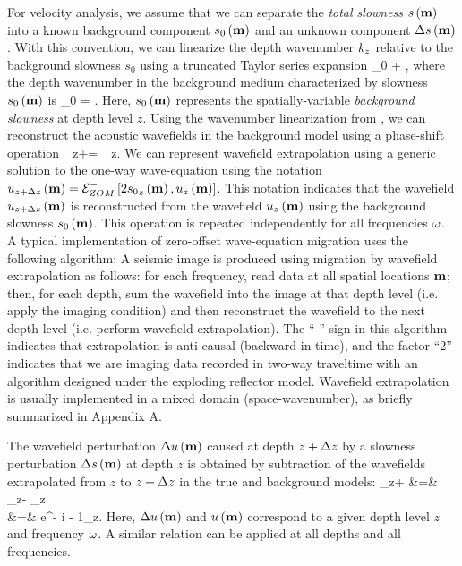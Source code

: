 For velocity analysis, we assume that we can separate the {\it total
slowness} $s\left ( {\bf m} \right)$ into a known background component $s_0\left ( {\bf m} \right)$ and an
unknown component $\Delta s\left ( {\bf m} \right)$. With this convention, we can linearize
the depth wavenumber ${k_z}$ relative to the background slowness $s_0$
using a truncated Taylor series expansion
%
\beq \label{eqn:SSR-taylor}
\kz \approx \kz_0 + \dkzds \ds\ofm \;,
\eeq
%
where the depth wavenumber in the background medium characterized by
slowness $s_0\left ( {\bf m} \right)$ is
%
\beq
\kz_0 = \SSR{2\ws_0\ofm}{\km} \;.
\eeq
%
Here, $s_0\left ( {\bf m} \right)$ represents the spatially-variable {\it background
slowness} at depth level $z$. Using the wavenumber linearization from
, we can reconstruct the acoustic wavefields in the
background model using a phase-shift operation
%
\beq
\UU_{z+\dz}\ofm = \PSo{-}\UU_z\ofm \;.
\eeq
%
We can represent wavefield extrapolation using a generic solution to
the one-way wave-equation using the notation
${u}_{z+\Delta z}\left ( {\bf m} \right)=\mathcal{E}^{-}_{ZOM}\left [ 2{s_0}_z\left ( {\bf m} \right),{u}_z\left ( {\bf m} \right) \right]$.  This
notation indicates that the wavefield ${u}_{z+\Delta z}\left ( {\bf m} \right)$ is
reconstructed from the wavefield ${u}_z\left ( {\bf m} \right)$ using the background
slowness $s_0\left ( {\bf m} \right)$. This operation is repeated independently for all
frequencies $\omega$. A typical implementation of zero-offset
wave-equation migration uses the following algorithm:
\zomig
A seismic image is produced using migration by wavefield extrapolation
as follows: for each frequency, read data at all spatial locations
${\bf m}$; then, for each depth, sum the wavefield into the image at that
depth level (i.e. apply the imaging condition) and then reconstruct
the wavefield to the next depth level (i.e. perform wavefield
extrapolation). The ``-'' sign in this algorithm indicates that
extrapolation is anti-causal (backward in time), and the factor ``2''
indicates that we are imaging data recorded in two-way traveltime with
an algorithm designed under the exploding reflector model. Wavefield
extrapolation is usually implemented in a mixed domain
(space-wavenumber), as briefly summarized in Appendix A.

The wavefield perturbation ${\Delta {u}}\left ( {\bf m} \right)$ caused at depth $z+\Delta z$ by a
slowness perturbation $\Delta s\left ( {\bf m} \right)$ at depth $z$ is obtained by
subtraction of the wavefields extrapolated from $z$ to $z+\Delta z$ in the
true and background models:
%
\bea 
\dUU_{z+\dz}\ofm 
&=& \PS{-}\UU_z\ofm - \PSo{-}\UU_z\ofm
\nonumber \\ \label{eqn:ZODW-nonlinear}
&=& \PSo{-} \lb e^{- i \dkzds \ds\ofm \dz} - 1\rb \UU_z\ofm \;.
\eea
Here, ${\Delta {u}}\left ( {\bf m} \right)$ and ${u}\left ( {\bf m} \right)$ correspond to a given depth level $z$
and frequency $\omega$. A similar relation can be applied at all depths
and all frequencies.

